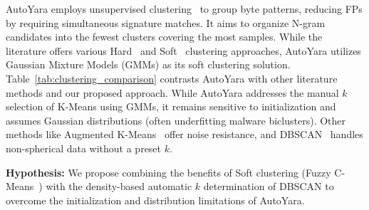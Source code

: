 \noindent AutoYara employs unsupervised clustering~\cite{jain1999_clustering_review} to group byte patterns, reducing FPs by requiring simultaneous signature matches. It aims to organize N-gram candidates into the fewest clusters covering the most samples. While the literature offers various Hard~\cite{lloyd1982_kmeans, ergun2022_learningaugmentedkmeansclustering, ester1996_DBSCAN} and Soft~\cite{bezdek1984_fuzzycmeans, reynolds2009_gaussianmixture, corduneanu2001_vbgmm} clustering approaches, AutoYara utilizes Gaussian Mixture Models (GMMs) as its soft clustering solution. Table~\ref{tab:clustering_comparison} contrasts AutoYara with other literature methods and our proposed approach. While AutoYara addresses the manual $k$ selection of K-Means using GMMs, it remains sensitive to initialization and assumes Gaussian distributions (often underfitting malware biclusters). Other methods like Augmented K-Means~\cite{ergun2022_learningaugmentedkmeansclustering} offer noise resistance, and DBSCAN~\cite{ester1996_DBSCAN} handles non-spherical data without a preset $k$. 

\begin{table}[!htbp]
\caption{Comparison of Clustering Methods}
\vspace{-6mm}
\begin{center}
\label{tab:clustering_comparison}
\end{center}
\vspace{-4mm}
\end{table}

\noindent \textbf{Hypothesis:} We propose combining the benefits of Soft clustering (Fuzzy C-Means~\cite{bezdek1984_fuzzycmeans}) with the density-based automatic $k$ determination of DBSCAN to overcome the initialization and distribution limitations of AutoYara.